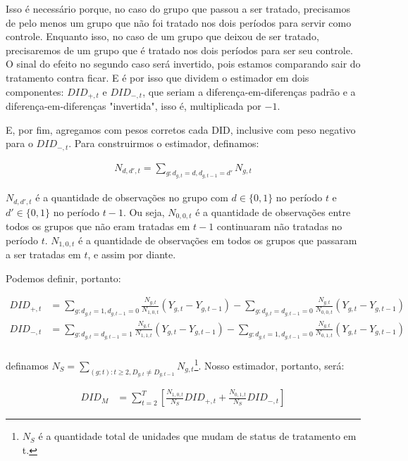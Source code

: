 \documentclass[portugues]{article}
\begin{document}
Isso é necessário porque, no caso do grupo que passou a ser tratado, precisamos de pelo menos um grupo que não foi tratado nos dois períodos para servir como controle. Enquanto isso, no caso de um grupo que deixou de ser tratado, precisaremos de um grupo que é tratado nos dois períodos para ser seu controle. O sinal do efeito no segundo caso será invertido, pois estamos comparando sair do tratamento contra ficar. E é por isso que \citet{de2020two} dividem o estimador em dois componentes: $DID_{+,t}$ e $DID_{-,t}$, que seriam a diferença-em-diferenças padrão e a diferença-em-diferenças "invertida", isso é, multiplicada por  $-1$.

E, por fim, agregamos com pesos corretos cada DID, inclusive com peso negativo para o $DID_{-,t}$. Para construirmos o estimador, definamos:

\[
\begin{split}
    N_{d,d', t} = \sum_{g: d_{g,t} = d, d_{g,t-1} = d'} N_{g,t}
\end{split}
\]

$N_{d,d', t}$ é a quantidade de observações no grupo com $d \in \{0,1\}$ no período $t$ e $d' \in \{0,1\}$ no período $t-1$. Ou seja, $N_{0,0,t}$ é a quantidade de observações entre todos os grupos que não eram tratadas em $t-1$ continuaram não tratadas no período $t$. $N_{1,0,t}$ é a quantidade de observações em todos os grupos que passaram a ser tratadas em $t$, e assim por diante. 

Podemos definir, portanto:

\[
\begin{split}
    DID_{+,t} &= \sum_{g: d_{g,t} = 1, d_{g,t-1} = 0} \frac{N_{g,t}}{N_{1,0, t}} (Y_{g,t} - Y_{g,t-1}) - \sum_{g: d_{g,t} = d_{g,t-1} = 0} \frac{N_{g,t}}{N_{0,0,t}} (Y_{g,t} - Y_{g,t-1}) \\
    DID_{-,t} &= \sum_{g: d_{g,t} = d_{g,t-1} = 1} \frac{N_{g,t}}{N_{1,1, t}} (Y_{g,t} - Y_{g,t-1}) - \sum_{g: d_{g,t} = 1, d_{g,t-1} = 0} \frac{N_{g,t}}{N_{0,1,t}} (Y_{g,t} - Y_{g,t-1}) \\
\end{split}
\]

\noindent definamos $N_S = \sum_{(g;t):t\geq2, D_{g,t}\neq D_{g,t-1}} N_{g,t}$\footnote{$N_S$ é a quantidade total de unidades que mudam de status de tratamento em t.}. Nosso estimador, portanto, será:

\[
\begin{split}
    DID_{M} &= \sum_{t=2}^{T} \left[ \frac{N_{1,0,t}}{N_S} DID_{+,t} + \frac{N_{0,1,t}}{N_S} DID_{-,t} \right] 
\end{split}
\]
\end{document}
